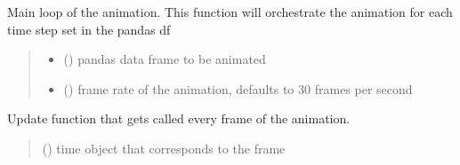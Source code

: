 \documentclass[letterpaper,10pt,english]{sphinxmanual}
\begin{document}
\begin{fulllineitems}

\begin{fulllineitems}
\label{\detokenize{index:sjvisualizer.Canvas.canvas.play}}
\pysigstartsignatures
{}
\pysigstopsignatures
\sphinxAtStartPar
Main loop of the animation. This function will orchestrate the animation for each time step set in the pandas df
\begin{quote}\begin{description}
\begin{itemize}
\item {} 
\sphinxAtStartPar
{} () \textendash{} pandas data frame to be animated

\item {} 
\sphinxAtStartPar
{} () \textendash{} frame rate of the animation, defaults to 30 frames per second

\end{itemize}

\end{description}\end{quote}

\end{fulllineitems}


\begin{fulllineitems}
\label{\detokenize{index:sjvisualizer.Canvas.canvas.set_decimals}}
\pysigstartsignatures
{}
\pysigstopsignatures
\end{fulllineitems}


\begin{fulllineitems}
\label{\detokenize{index:sjvisualizer.Canvas.canvas.update}}
\pysigstartsignatures
{}
\pysigstopsignatures
\sphinxAtStartPar
Update function that gets called every frame of the animation.
\begin{quote}\begin{description}
\sphinxAtStartPar
{} () \textendash{} time object that corresponds to the frame


\end{description}
\end{quote}
\end{fulllineitems}
\end{fulllineitems}
\end{document}
